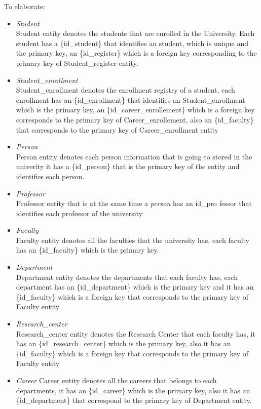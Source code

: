 \documentclass{article}
\begin{document}
To elaborate:
\begin{itemize}[label={}]
	\item \textit{Student}\\
	      Student entity denotes the students that are enrolled in the University.
	      Each student has a \{id\_student\} that identifies an student, which is
	      unique and the primary key, an \{id\_register\} which is a foreign key
	      corresponding to the primary key of Student\_register entity.
	\item \textit{Student\_enrollment}\\
	      Student\_enrollment denotes the enrollment registry of a student, each
	      enrollment has an \{id\_enrollment\} that identifies an Student\_enrollment
	      which is the primary key, an \{id\_career\_enrollement\} which is a foreign
	      key corresponds to the primary key of Career\_enrollement, also an
	      \{id\_faculty\} that corresponds to the primary key of Career\_enrollment entity

	\item \textit{Person}\\
	      Person entity denotes each person information that is going to stored in
	      the univerity it has a \{id\_person\} that is the primary key of the entity
	      and identifies each person.
	\item \textit{Professor}\\
	      Professor entity that is at the same time a \textit{person} has an id\_pro
	      fessor that identifies each professor of the university
	\item \textit{Faculty}\\
	      Faculty entity denotes all the faculties that the university has, each
	      faculty has an \{id\_faculty\} which is the primary key.
	\item \textit{Department}\\
	      Department entity denotes the departments that each faculty has, each
	      department has an \{id\_department\} which is the primary key and it has an
	      \{id\_faculty\} which is a foreign key that corresponds to the primary key
	      of Faculty entity
	\item \textit{Research\_center}\\
	      Research\_center entity denotes the Research Center that each faculty has,
	      it has an \{id\_research\_center\} which is the primary key, also it has
	      an \{id\_faculty\} which is a foreign key that corresponds to the primary key
	      of Faculty entity
	\item \textit{Career}
	      Career entity denotes all the careers that belongs to each departments,
	      it has an \{id\_career\} which is the primary key, also it has an \{id\_department\}
	      that correspond to the primary key of Department entity.
\end{itemize}
\end{document}
